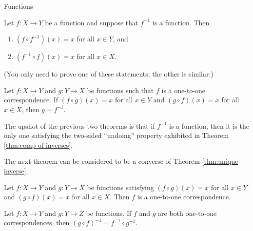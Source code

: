 \begin{section}{Functions}
\begin{theorem}\label{thm:comp of inverses}
Let $f:X\to Y$ be a function and suppose that $f^{-1}$ is a function.  Then
\begin{enumerate}
\item $(f\circ f^{-1})(x)=x$ for all $x\in Y$, and
\item $(f^{-1}\circ f)(x)=x$ for all $x\in X$.
\end{enumerate}
(You only need to prove one of these statements; the other is similar.)
\end{theorem}

\begin{theorem}\label{thm:unique inverse}
Let $f:X\to Y$ and $g:Y\to X$ be functions such that $f$ is a one-to-one correspondence.  If $(f\circ g)(x)=x$ for all $x\in Y$ and $(g\circ f)(x)=x$ for all $x\in X$, then $g=f^{-1}$.
\end{theorem}

\begin{remark}
The upshot of the previous two theorems is that if $f^{-1}$ is a function, then it is the only one satisfying the two-sided ``undoing'' property exhibited in Theorem \ref{thm:comp of inverses}.
\end{remark}

The next theorem can be considered to be a converse of Theorem \ref{thm:unique inverse}.

\begin{theorem}
Let $f:X\to Y$ and $g:Y\to X$ be functions satisfying $(f\circ g)(x)=x$ for all $x\in Y$ and $(g\circ f)(x)=x$ for all $x\in X$.  Then $f$ is a one-to-one correspondence.
\end{theorem}

\begin{theorem}
Let $f:X\to Y$ and $g:Y\to Z$ be functions.  If $f$ and $g$ are both one-to-one correspondences, then $(g\circ f)^{-1}=f^{-1}\circ g^{-1}$.
\end{theorem}

\end{section}

